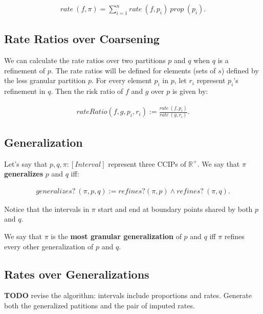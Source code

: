 \documentclass[]{article}
\begin{document}
\begin{align*}
rate\ (f, \pi) = \sum_{i = 1}^n rate\ (f, p_i)\ prop\ (p_i).
\end{align*}

\hypertarget{rate-ratios-over-coarsening}{%
\subsection{Rate Ratios over
Coarsening}\label{rate-ratios-over-coarsening}}

We can calculate the rate ratios over two partitions \(p\) and \(q\)
when \(q\) is a refinement of \(p\). The rate ratios will be defined for
elements (sets of \(s\)) defined by the less granular partition \(p\).
For every element \(p_i\) in \(p\), let \(r_i\) represent \(p_i\)'s
refinement in \(q\). Then the risk ratio of \(f\) and \(g\) over \(p\)
is given by:

\begin{align*}
rateRatio (f, g, p_i, r_i) := \frac{rate\ (f, p_i)}{rate\ (g, r_i)}.
\end{align*}

\hypertarget{generalization}{%
\subsection{Generalization}\label{generalization}}

Let's say that \(p, q, \pi : [Interval]\) represent three CCIPs of
\(\mathbb{R}^+\). We say that \(\pi\) \textbf{generalizes} \(p\) and
\(q\) iff:

\begin{align*}
generalizes?\ (\pi, p, q) := refines? (\pi, p) \wedge refines?\ (\pi, q).
\end{align*}

Notice that the intervals in \(\pi\) start and end at boundary points
shared by both \(p\) and \(q\).

We say that \(\pi\) is the \textbf{most granular generalization} of
\(p\) and \(q\) iff \(\pi\) refines every other generalization of \(p\)
and \(q\).

\hypertarget{rates-over-generalizations}{%
\subsection{Rates over
Generalizations}\label{rates-over-generalizations}}

\textbf{TODO} revise the algorithm: intervals include proportions and
rates. Generate both the generalized patitions and the pair of imputed
rates.
\end{document}
